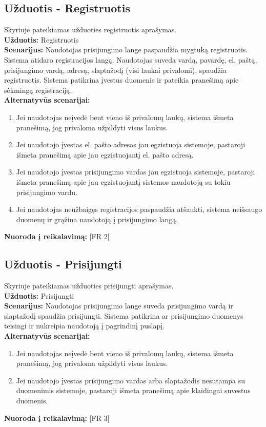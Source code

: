\documentclass{VUMIFPSkursinis}
\begin{document}
	\subsection{Užduotis - Registruotis}
	Skyriuje pateikiamas užduoties registruotis aprašymas.\\
	\textbf{Užduotis:}  Registruotis \\
	\textbf{Scenarijus:} Naudotojas prisijungimo lange paspaudžia mygtuką registruotis. Sistema atidaro registracijos langą. Naudotojas suveda vardą, pavardę,  el. paštą, prisijungimo vardą, adresą, slaptažodį (visi laukai privalomi), spaudžia registruotis. Sistema patikrina įvestus duomenis ir pateikia pranešimą apie sėkmingą registraciją.\\
	\textbf{Alternatyvūs scenarijai:}
	\begin{enumerate}
		\item Jei naudotojas neįvedė bent vieno iš privalomų laukų, sistema išmeta pranešimą, jog privaloma užpildyti visus laukus.
		\item Jei naudotojo įvestas el. pašto adresas jau egzistuoja sistemoje, pastaroji išmeta pranešimą apie jau egzistuojantį el. pašto adresą.
		\item Jei naudotojo įvestas prisijungimo vardas jau egzistuoja sistemoje, pastaroji išmeta pranešimą apie jau egzistuojantį sistemos naudotoją su tokiu prisijungimo vardu.
		\item Jei naudotojas neužbaigęs registracijos paspaudžia atšaukti, sistema neišsaugo duomenų ir grąžina naudotoją į prisijungimo langą.
	\end{enumerate}
	\textbf{Nuoroda į reikalavimą: } [FR 2]\\

	\subsection{Užduotis - Prisijungti}
	Skyriuje pateikiamas užduoties prisijungti aprašymas.\\
	\textbf{Užduotis:}  Prisijungti \\
	\textbf{Scenarijus:} Naudotojas prisijungimo lange suveda prisijungimo vardą ir slaptažodį spaudžia prisijungti. Sistema patikrina ar prisijungimo duomenys teisingi ir nukreipia naudotoją į pagrindinį puslapį. \\
	\textbf{Alternatyvūs scenarijai:}
	\begin{enumerate}
		\item Jei naudotojas neįvedė bent vieno iš privalomų laukų, sistema išmeta pranešimą, jog privaloma užpildyti visus laukus.
		\item Jei naudotojo įvestas prisijungimo vardas arba slaptažodis nesutampa su duomenimis sistemoje, pastaroji išmeta pranešimą apie klaidingai suvestus duomenis.
	\end{enumerate}
	\textbf{Nuoroda į reikalavimą: } [FR 3]
\end{document}
